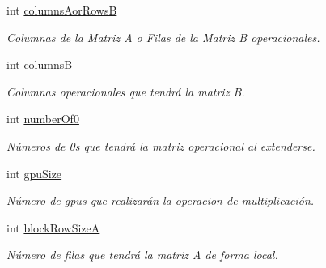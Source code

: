 \begin{DoxyCompactItemize}
int \hyperlink{structOperationProperties_ab6b3c2b1976486e9da06d17e537e2850}{columns\+Aor\+RowsB}
\begin{DoxyCompactList}\small\item\em Columnas de la Matriz A o Filas de la Matriz B operacionales. \end{DoxyCompactList}\item 
\mbox{\label{structOperationProperties_a4e9599cb35c7e0fc4b38d69182cbf4b8}} 
int \hyperlink{structOperationProperties_a4e9599cb35c7e0fc4b38d69182cbf4b8}{columnsB}
\begin{DoxyCompactList}\small\item\em Columnas operacionales que tendrá la matriz B. \end{DoxyCompactList}\item 
\mbox{\label{structOperationProperties_a277e0534c0faf0b58a8cf64a1270f6eb}} 
int \hyperlink{structOperationProperties_a277e0534c0faf0b58a8cf64a1270f6eb}{number\+Of0}
\begin{DoxyCompactList}\small\item\em Números de 0s que tendrá la matriz operacional al extenderse. \end{DoxyCompactList}\item 
\mbox{\label{structOperationProperties_a72fc7e458a7eb3f50f975ba923797f2f}} 
int \hyperlink{structOperationProperties_a72fc7e458a7eb3f50f975ba923797f2f}{gpu\+Size}
\begin{DoxyCompactList}\small\item\em Número de gpus que realizarán la operacion de multiplicación. \end{DoxyCompactList}\item 
\mbox{\label{structOperationProperties_a6a55c40e6010a8802947011d62408969}} 
int \hyperlink{structOperationProperties_a6a55c40e6010a8802947011d62408969}{block\+Row\+SizeA}
\begin{DoxyCompactList}\small\item\em Número de filas que tendrá la matriz A de forma local. \end{DoxyCompactList}\item 
\mbox{\label{structOperationProperties_a2a4e92bd14269db5a449fb4a49ad6cd3}} 

\end{DoxyCompactItemize}
